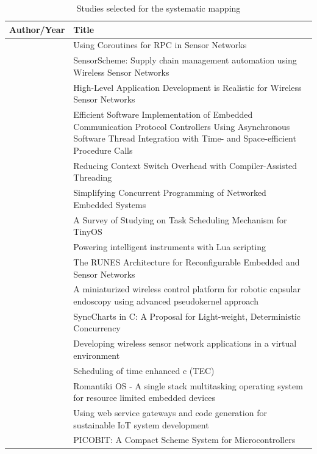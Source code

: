 \documentclass[format=acmsmall, review=false, screen=false]{acmart}
\begin{document}
\begin{longtable}[c]{ l p{8cm} } 
	\caption{Studies selected for the systematic mapping
	\label{dataset}}\\
	\hline

Author/Year & Title \\ \hline
\endhead

 \cite{Cohen2007b} & Using Coroutines for RPC in Sensor Networks \\
\cite{Evers2007} & SensorScheme: Supply chain management automation using Wireless Sensor Networks \\
\cite{Karpin2007} & High-Level Application Development is Realistic for Wireless Sensor Networks \\
\cite{Kumar2007} & Efficient Software Implementation of Embedded Communication Protocol Controllers Using Asynchronous Software Thread Integration with Time- and Space-efficient Procedure Calls \\
\cite{Jaaskelainen2008} & Reducing Context Switch Overhead with Compiler-Assisted Threading \\
\cite{Khezri2008} & Simplifying Concurrent Programming of Networked Embedded Systems \\
\cite{Yu2008} & A Survey of Studying on Task Scheduling Mechanism for TinyOS \\
\cite{Clark2009} & Powering intelligent instruments with Lua scripting \\
\cite{Oldewurtel2009} & The RUNES Architecture for Reconfigurable Embedded and Sensor Networks \\
\cite{Susilo2009} & A miniaturized wireless control platform for robotic capsular endoscopy using advanced pseudokernel approach \\
\cite{VonHanxleden2009} & SyncCharts in C: A Proposal for Light-weight, Deterministic Concurrency \\
\cite{Boers2010} & Developing wireless sensor network applications in a virtual environment \\
\cite{Fritzsche2010} & Scheduling of time enhanced c (TEC) \\
\cite{Glistvain2010} & Romantiki OS - A single stack multitasking operating system for resource limited embedded devices \\
\cite{Riedel2010} & Using web service gateways and code generation for sustainable IoT system development \\
\cite{St-Amour2010} & PICOBIT: A Compact Scheme System for Microcontrollers \\

\end{longtable}
\end{document}
